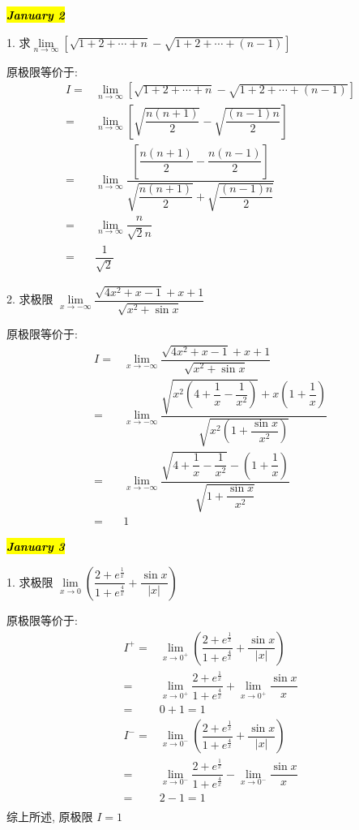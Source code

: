 \hl{\textbf{\textit{January 2}}}

1. 求$\lim\limits_{n\to\infty}\left[\sqrt{1+2+\cdots+n}-\sqrt{1+2+\cdots+(n-1)}\right]$
\begin{solution}

	原极限等价于: 
	\begin{align*}
		I = & \lim\limits_{n\to\infty}\left[\sqrt{1+2+\cdots+n}-\sqrt{1+2+\cdots+(n-1)}\right]\\
		= & \lim\limits_{n\to\infty}\left[\sqrt{\dfrac{n(n+1)}{2}}-\sqrt{\dfrac{(n-1)n}{2}}\right]\\
		= & \lim\limits_{n\to\infty}\dfrac{\left[\dfrac{n(n+1)}{2}-\dfrac{n(n-1)}{2}\right]}{\sqrt{\dfrac{n(n+1)}{2}}+\sqrt{\dfrac{(n-1)n}{2}}}\\
		= & \lim\limits_{n\to\infty}\dfrac{n}{\sqrt{2}n}\\
		= & \dfrac{1}{\sqrt{2}} 
	\end{align*}
\end{solution}

2. 求极限 $\lim\limits_{x\to-\infty}\dfrac{\sqrt{4x^{2}+x-1}+x+1}{\sqrt{x^{2}+\sin x}}$
\begin{solution}

	原极限等价于:
	\begin{align*}
		I = & \lim\limits_{x\to-\infty}\dfrac{\sqrt{4x^{2}+x-1}+x+1}{\sqrt{x^{2}+\sin x}}\\
		= & \lim\limits_{x\to-\infty}\dfrac{\sqrt{x^{2}(4+\dfrac{1}{x}-\dfrac{1}{x^{2}})}+x(1+\dfrac{1}{x})}{\sqrt{x^{2}(1+\dfrac{\sin x}{x^{2}})}}\\
		= & \lim\limits_{x\to-\infty}\dfrac{\sqrt{4+\dfrac{1}{x}-\dfrac{1}{x^{2}}}-(1+\dfrac{1}{x})}{\sqrt{1+\dfrac{\sin x}{x^{2}}}}\\
		= & 1
	\end{align*}
\end{solution}

\hl{\textbf{\textit{January 3}}}

1. 求极限 $\lim\limits_{x\to 0}\left(\dfrac{2+e^{\frac{1}{x}}}{1+e^{\frac{4}{x}}}+\dfrac{\sin x}{|x|}\right)$
\begin{solution}

	原极限等价于:
	\begin{align*}
		I^{+} = & \lim\limits_{x\to 0^{+}}\left(\dfrac{2+e^{\frac{1}{x}}}{1+e^{\frac{4}{x}}}+\dfrac{\sin x}{|x|}\right)\\
		      = & \lim\limits_{x\to 0^{+}}\dfrac{2+e^{\frac{1}{x}}}{1+e^{\frac{4}{x}}}+\lim\limits_{x\to 0^{+}}\dfrac{\sin x}{x}\\
			  = & 0+1 = 1\\
		I^{-} = & \lim\limits_{x\to 0^{-}}\left(\dfrac{2+e^{\frac{1}{x}}}{1+e^{\frac{4}{x}}}+\dfrac{\sin x}{|x|}\right)\\
			  = & \lim\limits_{x\to 0^{-}}\dfrac{2+e^{\frac{1}{x}}}{1+e^{\frac{4}{x}}}-\lim\limits_{x\to 0^{-}}\dfrac{\sin x}{x}\\
			  = & 2-1 = 1\\
	\end{align*}
	综上所述, 原极限 $I =1$
\end{solution}

